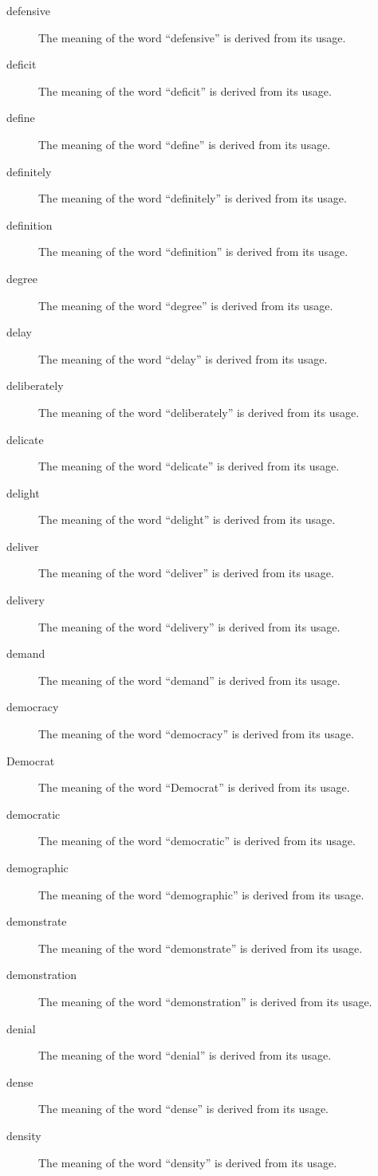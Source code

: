 \documentclass[12pt, letterpaper]{memoir}
\begin{document}
\begin{description}
\item[defensive] The meaning of the word ``defensive'' is derived from its usage.
\item[deficit] The meaning of the word ``deficit'' is derived from its usage.
\item[define] The meaning of the word ``define'' is derived from its usage.
\item[definitely] The meaning of the word ``definitely'' is derived from its usage.
\item[definition] The meaning of the word ``definition'' is derived from its usage.
\item[degree] The meaning of the word ``degree'' is derived from its usage.
\item[delay] The meaning of the word ``delay'' is derived from its usage.
\item[deliberately] The meaning of the word ``deliberately'' is derived from its usage.
\item[delicate] The meaning of the word ``delicate'' is derived from its usage.
\item[delight] The meaning of the word ``delight'' is derived from its usage.
\item[deliver] The meaning of the word ``deliver'' is derived from its usage.
\item[delivery] The meaning of the word ``delivery'' is derived from its usage.
\item[demand] The meaning of the word ``demand'' is derived from its usage.
\item[democracy] The meaning of the word ``democracy'' is derived from its usage.
\item[Democrat] The meaning of the word ``Democrat'' is derived from its usage.
\item[democratic] The meaning of the word ``democratic'' is derived from its usage.
\item[demographic] The meaning of the word ``demographic'' is derived from its usage.
\item[demonstrate] The meaning of the word ``demonstrate'' is derived from its usage.
\item[demonstration] The meaning of the word ``demonstration'' is derived from its usage.
\item[denial] The meaning of the word ``denial'' is derived from its usage.
\item[dense] The meaning of the word ``dense'' is derived from its usage.
\item[density] The meaning of the word ``density'' is derived from its usage.

\end{description}
\end{document}
